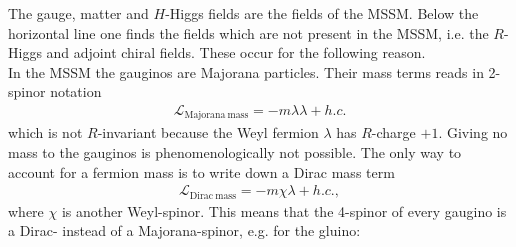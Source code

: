 The gauge, matter and $H$-Higgs fields are the fields of the MSSM. Below the horizontal line one finds the fields which are not present in the MSSM, i.e. the $R$-Higgs and adjoint chiral fields. These occur for the following reason.\\
In the MSSM the gauginos are Majorana particles. Their mass terms  reads in 2-spinor notation
\begin{align}
\mathcal{L}_{\mathrm{Majorana\ mass}} = -m\lambda\lambda + h.c.
\end{align}
which is not $R$-invariant because the Weyl fermion $\lambda$ has $R$-charge $+1$. Giving no mass to the gauginos is phenomenologically not possible. The only way to account for a fermion mass is to write down a Dirac mass term
\begin{align}
\mathcal{L}_{\mathrm{Dirac\ mass}} = -m \chi\lambda + h.c.,
\end{align}
where $\chi$ is another Weyl-spinor. This means that the 4-spinor of every gaugino is a Dirac- instead of a Majorana-spinor, e.g. for the gluino:
